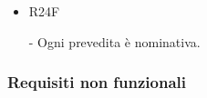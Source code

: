 \documentclass[a4paper]{article}
\begin{document}
\begin{itemize}
	\item \hypertarget{R24F}{R24F} - Ogni prevedita è nominativa.
	
	

	
	
		
	
	
\end{itemize}

\subsubsection{Requisiti non funzionali}
\end{document}
